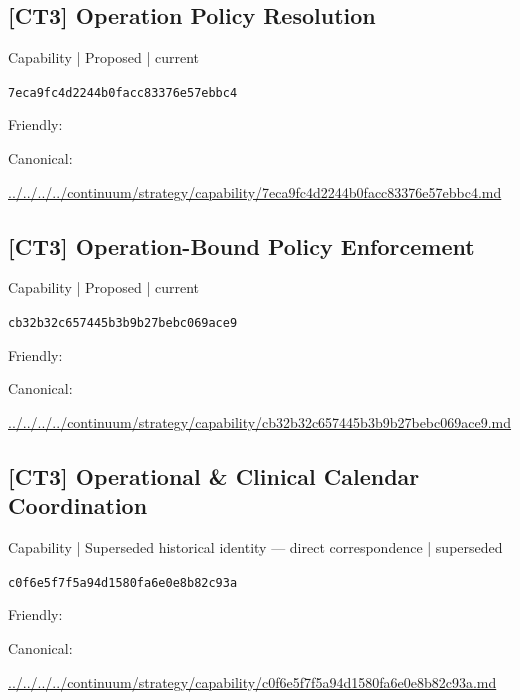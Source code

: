 \documentclass[10pt,a4paper]{article}
\begin{document}
\subsection*{[CT3] Operation Policy Resolution}
{\small Capability | Proposed | current}\par
\texttt{7eca9fc4d2244b0facc83376e57ebbc4}\par
Friendly: \par
Canonical: \par
{\footnotesize\url{../../../../continuum/strategy/capability/7eca9fc4d2244b0facc83376e57ebbc4.md}}\par
\subsection*{[CT3] Operation-Bound Policy Enforcement}
{\small Capability | Proposed | current}\par
\texttt{cb32b32c657445b3b9b27bebc069ace9}\par
Friendly: \par
Canonical: \par
{\footnotesize\url{../../../../continuum/strategy/capability/cb32b32c657445b3b9b27bebc069ace9.md}}\par
\subsection*{[CT3] Operational \& Clinical Calendar Coordination}
{\small Capability | Superseded historical identity — direct correspondence | superseded}\par
\texttt{c0f6e5f7f5a94d1580fa6e0e8b82c93a}\par
Friendly: \par
Canonical: \par
{\footnotesize\url{../../../../continuum/strategy/capability/c0f6e5f7f5a94d1580fa6e0e8b82c93a.md}}\par
\end{document}
